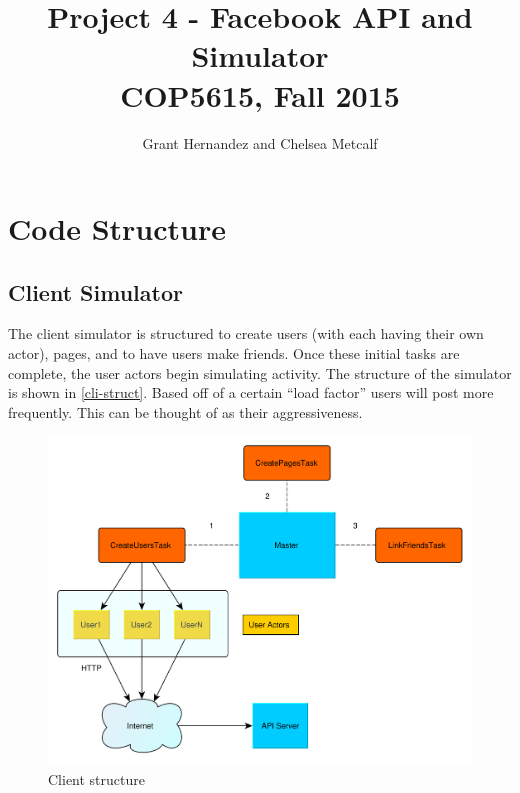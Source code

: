 \documentclass{article}
\begin{document}
\title{Project 4 - Facebook API and Simulator \\ COP5615, Fall 2015}
 
\author{Grant Hernandez and Chelsea Metcalf}
 
\maketitle %
 
\section*{Code Structure}

\subsection*{Client Simulator}

The client simulator is structured to create users (with each having their own actor), pages, and to have users make friends. Once these initial tasks are complete, the user actors begin simulating activity. The structure of the simulator is shown in \autoref{cli-struct}. Based off of a certain ``load factor'' users will post more frequently. This can be thought of as their aggressiveness.

\begin{figure}[H]
  \centering
  \includegraphics[scale=0.5]{diagrams/client-structure.pdf}
  \caption{Client structure}
  \label{cli-struct}
\end{figure}
\end{document}
